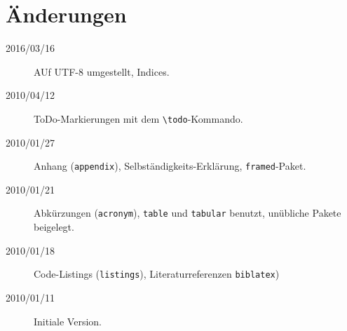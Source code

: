 
\chapter*{Änderungen}

\begin{description}
\item[2016/03/16] AUf UTF-8 umgestellt, Indices.
\item[2010/04/12] ToDo-Markierungen mit dem \verb+\todo+-Kommando.
\item[2010/01/27] Anhang (\texttt{appendix}), Selbständigkeits-Erklärung, \texttt{framed}-Paket.
\item[2010/01/21] Abkürzungen (\texttt{acronym}), \texttt{table} und \texttt{tabular} benutzt,
     unübliche Pakete beigelegt.
\item[2010/01/18] Code-Listings (\texttt{listings}), Literaturreferenzen \texttt{biblatex})
\item[2010/01/11] Initiale Version.
\end{description}
